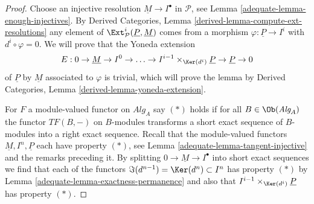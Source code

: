 \begin{proof}

Choose an injective resolution $\underline{M} \to I^\bullet$ in
$\mathcal{P}$, see
Lemma \ref{adequate-lemma-enough-injectives}.
By
Derived Categories, Lemma \ref{derived-lemma-compute-ext-resolutions}
any element of $\Ext^i_\mathcal{P}(\underline{P}, \underline{M})$
comes from a morphism $\varphi : \underline{P} \to I^i$ with
$d^i \circ \varphi = 0$. We will prove that the
Yoneda extension
$$
E : 0 \to \underline{M} \to I^0 \to \ldots \to
I^{i - 1} \times_{\Ker(d^i)} \underline{P} \to \underline{P} \to 0
$$
of $\underline{P}$ by $\underline{M}$
associated to $\varphi$ is trivial, which will prove the lemma by
Derived Categories, Lemma \ref{derived-lemma-yoneda-extension}.

\medskip\noindent
For $F$ a module-valued functor on $\textit{Alg}_A$
say $(*)$ holds if for all $B \in \Ob(\textit{Alg}_A)$ the
functor $TF(B, -)$ on $B$-modules transforms a short exact sequence
of $B$-modules into a right exact sequence.
Recall that the module-valued functors $\underline{M}, I^n, \underline{P}$
each have property $(*)$, see
Lemma \ref{adequate-lemma-tangent-injective}
and the remarks preceding it.
By splitting $0 \to \underline{M} \to I^\bullet$ into short
exact sequences we find that each of the functors
$\Im(d^{n - 1}) = \Ker(d^n) \subset I^n$ has property $(*)$ by
Lemma \ref{adequate-lemma-exactness-permanence}
and also that $I^{i - 1} \times_{\Ker(d^i)} \underline{P}$ has property
$(*)$.


\end{proof}
